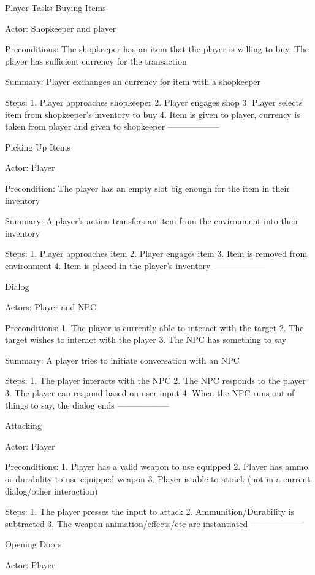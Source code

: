\documentclass[12pt]{report}
\begin{document}
\begin {section}{Player Tasks}
Buying Items %

Actor: Shopkeeper and player

Preconditions: The shopkeeper has an item that the player is willing to buy. The player has sufficient
currency for the transaction

Summary: Player exchanges an currency for item with a shopkeeper

Steps: 
1. Player approaches shopkeeper
2. Player engages shop
3. Player selects item from shopkeeper's inventory to buy
4. Item is given to player, currency is taken from player and given to shopkeeper
------------------

Picking Up Items %

Actor: Player

Precondition: The player has an empty slot big enough for the item in their inventory

Summary: A player's action transfers an item from the environment into their inventory

Steps:
1. Player approaches item
2. Player engages item
3. Item is removed from environment
4. Item is placed in the player's  inventory
------------------

Dialog %

Actors: Player and NPC

Preconditions:
1. The player is currently able to interact with the target
2. The target wishes to interact with the player
3. The NPC has something to say

Summary: A player tries to initiate conversation with an NPC

Steps:
1. The player interacts with the NPC
2. The NPC responds to the player
3. The player can respond based on user input
4. When the NPC runs out of things to say, the dialog ends
------------------

Attacking %

Actor: Player

Preconditions:
1. Player has a valid weapon to use equipped
2. Player has ammo or durability to use equipped weapon
3. Player is able to attack (not in a current dialog/other interaction)

Steps:
1. The player presses the input to attack
2. Ammunition/Durability is subtracted
3. The weapon animation/effects/etc are instantiated
------------------

Opening Doors %

Actor: Player


\end{section}
\end{document}
